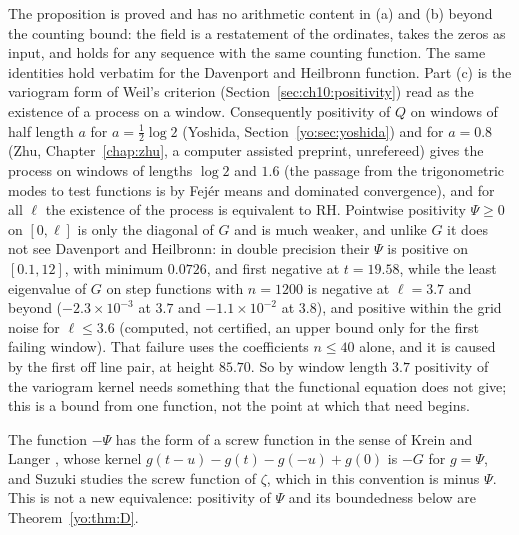 The proposition is proved and has no arithmetic content in (a) and (b) beyond the counting bound: the field is a restatement of the ordinates, takes the zeros as input, and holds for any sequence with the same counting function. The same identities hold verbatim for the Davenport and Heilbronn function. Part (c) is the variogram form of Weil's criterion (Section~\ref{sec:ch10:positivity}) read as the existence of a process on a window. Consequently positivity of $Q$ on windows of half length $a$ for $a=\frac12\log2$ (Yoshida, Section~\ref{yo:sec:yoshida}) and for $a=0.8$ (Zhu, Chapter~\ref{chap:zhu}, a computer assisted preprint, unrefereed) gives the process on windows of lengths $\log2$ and $1.6$ (the passage from the trigonometric modes to test functions is by Fej\'er means and dominated convergence), and for all $\ell$ the existence of the process is equivalent to RH. Pointwise positivity $\Psi\ge0$ on $[0,\ell]$ is only the diagonal of $G$ and is much weaker, and unlike $G$ it does not see Davenport and Heilbronn: in double precision their $\Psi$ is positive on $[0.1,12]$, with minimum $0.0726$, and first negative at $t=19.58$, while the least eigenvalue of $G$ on step functions with $n=1200$ is negative at $\ell=3.7$ and beyond ($-2.3\times10^{-3}$ at $3.7$ and $-1.1\times10^{-2}$ at $3.8$), and positive within the grid noise for $\ell\le3.6$ (computed, not certified, an upper bound only for the first failing window). That failure uses the coefficients $n\le40$ alone, and it is caused by the first off line pair, at height $85.70$. So by window length $3.7$ positivity of the variogram kernel needs something that the functional equation does not give; this is a bound from one function, not the point at which that need begins.

The function $-\Psi$ has the form of a screw function in the sense of Krein and Langer \cite{KreinLanger14}, whose kernel $g(t-u)-g(t)-g(-u)+g(0)$ is $-G$ for $g=\Psi$, and Suzuki \cite{Suzuki22} studies the screw function of $\zeta$, which in this convention is minus $\Psi$. This is not a new equivalence: positivity of $\Psi$ and its boundedness below are Theorem~\ref{yo:thm:D}.

